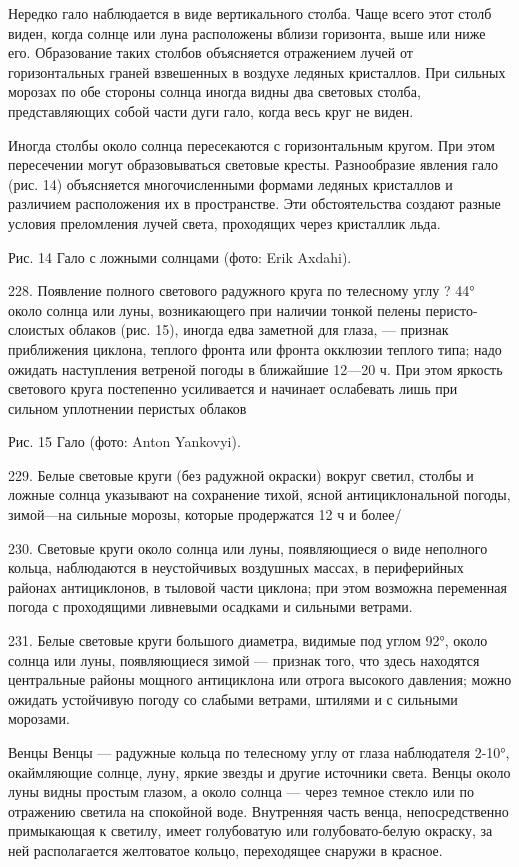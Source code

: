 Нередко гало наблюдается в виде вертикального столба. Чаще всего этот столб виден, когда солнце или луна расположены вблизи горизонта, выше или ниже его. Образование таких столбов объясняется отражением лучей от горизонтальных граней взвешенных в воздухе ледяных кристаллов. При сильных морозах по обе стороны солнца иногда видны два световых столба, представляющих собой части дуги гало, когда весь круг не виден.

Иногда столбы около солнца пересекаются с горизонтальным кругом. При этом пересечении могут образовываться световые кресты. Разнообразие явления гало (рис. 14) объясняется многочисленными формами ледяных кристаллов и различием расположения их в пространстве. Эти обстоятельства создают разные условия преломления лучей света, проходящих через кристаллик льда.


Рис. 14 Гало с ложными солнцами (фото: Erik Axdahi).

228. Появление полного светового радужного круга по телесному углу ? 44° около солнца или луны, возникающего при наличии тонкой пелены перисто-слоистых облаков (рис. 15), иногда едва заметной для глаза, — признак приближения циклона, теплого фронта или фронта окклюзии теплого типа; надо ожидать наступления ветреной погоды в ближайшие 12—20 ч. При этом яркость светового круга постепенно усиливается и начинает ослабевать лишь при сильном уплотнении перистых облаков


Рис. 15 Гало (фото: Anton Yankovyi).

229. Белые световые круги (без радужной окраски) вокруг светил, столбы и ложные солнца указывают на сохранение тихой, ясной антициклональной погоды, зимой—на сильные морозы, которые продержатся 12 ч и более/

230. Световые круги около солнца или луны, появляющиеся о виде неполного кольца, наблюдаются в неустойчивых воздушных массах, в периферийных районах антициклонов, в тыловой части циклона; при этом возможна переменная погода с проходящими ливневыми осадками и сильными ветрами.

231. Белые световые круги большого диаметра, видимые под углом 92°, около солнца или луны, появляющиеся зимой — признак того, что здесь находятся центральные районы мощного антициклона или отрога высокого давления; можно ожидать устойчивую погоду со слабыми ветрами, штилями и с сильными морозами.

Венцы
Венцы — радужные кольца по телесному углу от глаза наблюдателя 2-10°, окаймляющие солнце, луну, яркие звезды и другие источники света. Венцы около луны видны простым глазом, а около солнца — через темное стекло или по отражению светила на спокойной воде. Внутренняя часть венца, непосредственно примыкающая к светилу, имеет голубоватую или голубовато-белую окраску, за ней располагается желтоватое кольцо, переходящее снаружи в красное.

